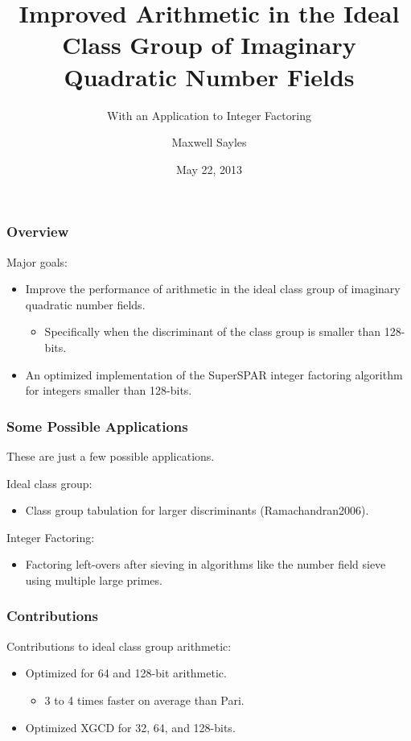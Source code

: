 \documentclass{beamer}
\title[Ideal Class Group]{Improved Arithmetic in the Ideal Class Group of Imaginary Quadratic Number Fields}
\subtitle{With an Application to Integer Factoring}
\author{Maxwell Sayles}
\date{May 22, 2013}
\institute{
	\bigskip 
       Department of Computer Science \\
       University of Calgary
}
\begin{document}
\maketitle

\begin{frame}
\frametitle{Overview}

Major goals:
\begin{itemize}
\item Improve the performance of arithmetic in the ideal class group of imaginary quadratic number fields.
	\begin{itemize}
	\item Specifically when the discriminant of the class group is smaller than 128-bits.
	\end{itemize}
\item An optimized implementation of the SuperSPAR integer factoring algorithm for integers smaller than 128-bits.
\end{itemize}

\end{frame}

\begin{frame}
\frametitle{Some Possible Applications}
These are just a few possible applications. \bigskip

Ideal class group:
\begin{itemize}
\item Class group tabulation for larger discriminants \break (Ramachandran2006).
\end{itemize}

\bigskip
Integer Factoring:
\begin{itemize}
\item Factoring left-overs after sieving in algorithms like the number field sieve using multiple large primes.
\end{itemize}

\end{frame}

\begin{frame}
\frametitle{Contributions}
Contributions to ideal class group arithmetic:
\begin{itemize} %
\item Optimized for 64 and 128-bit arithmetic.
	\begin{itemize}
	\item 3 to 4 times faster on average than Pari.
	\end{itemize}
\item Optimized XGCD for 32, 64, and 128-bits.
\end{itemize}
\end{frame}
\end{document}
